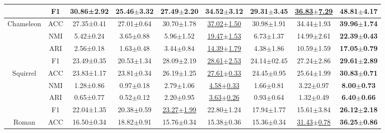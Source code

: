 \documentclass[sigconf]{acmart}
\begin{document}
\begin{table}[ht]
\begin{tabular}{c|c|ccccccc}
        &F1 & 30.86±2.92 & 25.46$\pm$3.32 & 27.49$\pm$2.20& 34.52$\pm$3.12 &29.31$\pm$3.45&\underline{36.83$\pm$7.29} &\textbf{48.81$\pm$4.17}  \\
        \midrule
        \multirow{4}{*}{Chameleon}
        &ACC & 27.35±0.41 & 27.01$\pm$0.64 & 30.70$\pm$1.78&\underline{37.02$\pm$1.50} &30.98$\pm$1.91&34.44$\pm$1.93 &\textbf{39.96$\pm$1.74} \\
        &NMI& 5.42±0.24 & 3.65$\pm$0.88 & 5.96$\pm$1.52&\underline{19.47$\pm$1.53} &6.73$\pm$1.37&14.99$\pm$2.61 &\textbf{22.39$\pm$0.43} \\
        & ARI &2.56±0.18 & 1.63$\pm$0.48 & 3.44$\pm$0.84&\underline{14.39$\pm$1.79} &  4.38$\pm$1.86&10.59$\pm$1.59 & \textbf{17.05$\pm$0.79} \\
        &F1 &23.49±0.35 & 20.53$\pm$1.34 &28.09$\pm$2.19&\underline{28.61$\pm$2.53} &24.14$\pm$02.45&27.24$\pm$2.86  & \textbf{29.61$\pm$2.89} \\
        \midrule
        \multirow{4}{*}{Squirrel}
         &ACC & 23.83±1.17 & 23.81$\pm$0.34 & 26.19$\pm$1.25&\underline{27.61$\pm$0.33} &24.45$\pm$0.95&25.64$\pm$1.99 &\textbf{30.83$\pm$0.71} \\
        &NMI & 1.28±0.86 & 0.97$\pm$0.18 & 2.79$\pm$1.06&\underline{4.58$\pm$0.33} &1.66$\pm$0.81&3.22$\pm$0.97&\textbf{8.00$\pm$0.73} \\
        & ARI  &0.65±0.77 & 0.52$\pm$0.12 & 2.20$\pm$0.95&\underline{3.63$\pm$0.26} & 0.93$\pm$0.64&1.32$\pm$0.49& \textbf{6.40$\pm$0.66} \\
        &F1  &22.04±1.35 & 20.38$\pm$0.59 &\underline{23.27$\pm$1.99}&22.80$\pm$1.24& 17.94$\pm$1.77&15.61$\pm$3.84 & \textbf{26.12$\pm$2.18} \\
        \midrule
        \multirow{4}{*}{Roman}
        &ACC& 16.50±0.34 & 18.82$\pm$0.91 &15.76$\pm$0.34&15.38$\pm$0.36&15.36$\pm$0.34&\underline{31.43$\pm$0.78}&\textbf{36.25$\pm$0.86}\\

\end{tabular}
\end{table}
\end{document}
